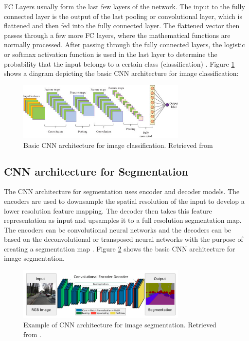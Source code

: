\ac{FC} Layers usually form the last few layers of the network. The input to the fully connected layer is the output of the last pooling or convolutional layer, which is flattened and then fed into the fully connected layer. The flattened vector then passes through a few more \ac{FC} layers, where the mathematical functions are normally processed. After passing through the fully connected layers, the logistic or softmax activation function is used in the last layer to determine the probability that the input belongs to a certain class (classification) \cite{guide:cnn}. Figure \ref{fig:cnn_class} shows a diagram depicting the basic \ac{CNN} architecture for image classification:

\begin{figure}[!htb]
  \centering
  \includegraphics[width=0.75\textwidth]{Images/cnn_class.jpg}
  \caption[Basic \ac{CNN} architecture for image classification.]{Basic \ac{CNN} architecture for image classification. Retrieved from \cite{image:CNN}}
  \label{fig:cnn_class}
\end{figure}

\subsection{\ac{CNN} architecture for Segmentation}

The \ac{CNN} architecture for segmentation uses encoder and decoder models. The encoders are used to downsample the spatial resolution of the input to develop a lower resolution feature mapping. The decoder then takes this feature representation as input and upsamples it to a full resolution segmentation map. The encoders can be convolutional neural networks and the decoders can be based on the deconvolutional or transposed neural networks with the purpose of creating a segmentation map \cite{enconders}. Figure \ref{fig:cnn_seg} shows the basic \ac{CNN} architecture for image segmentation.

\begin{figure}[!htb]
  \centering
  \includegraphics[width=0.75\textwidth]{Images/seg_cnn.jpg}
  \caption[Example of \ac{CNN} architecture for image segmentation.]{Example of \ac{CNN} architecture for image segmentation. Retrieved from \cite{segnet}.}
  \label{fig:cnn_seg}
\end{figure}

